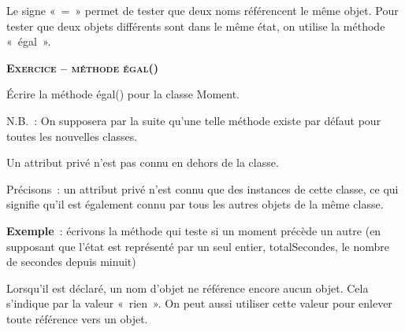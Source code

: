 \begin{liste}
	\item 
		Le signe «~=~» permet de tester que deux noms référencent le même objet.
		Pour tester que deux objets différents sont dans le même état, on
		utilise la méthode «~égal~».
		\\
		\bigskip
\end{liste}

\bigskip

{\sffamily\bfseries\scshape
Exercice – méthode égal()}

Écrire la méthode égal() pour la classe Moment.

\bigskip

N.B.~: On supposera par la suite qu'une telle méthode
existe par défaut pour toutes les nouvelles classes.

\begin{liste}
	\item {
		Un attribut privé n'est pas connu en dehors de la
		classe. 
		
		Précisons~: un attribut privé n'est connu que
		des instances de cette classe, ce qui signifie qu'il
		est également connu par tous les autres objets de la même
		classe.

		\textbf{Exemple}~: écrivons la méthode qui teste si un moment précède un
		autre (en supposant que l'état est représenté par un
		seul entier, totalSecondes, le nombre de secondes depuis minuit)
		\\
		\bigskip
		\bigskip
		}
	\item {
		Lorsqu'il est déclaré, un nom d'objet
		ne référence encore aucun objet. Cela s'indique par la
		valeur «~rien~». On peut aussi utiliser cette valeur pour enlever toute
		référence vers un objet.
		\\
		\bigskip
		}
\end{liste}
	

